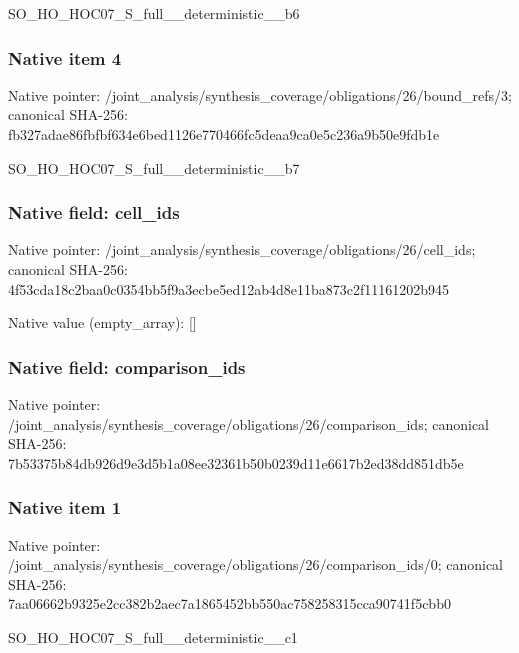 \documentclass[10pt,a4paper]{article}
\begin{document}
\begingroup\raggedright\sloppy SO\_\allowbreak{}HO\_\allowbreak{}HOC07\_\allowbreak{}S\_\allowbreak{}full\_\allowbreak{}\_\allowbreak{}deterministic\_\allowbreak{}\_\allowbreak{}b6\par\endgroup

\subsubsection{Native item 4}
Native pointer: /joint\_\allowbreak{}analysis/synthesis\_\allowbreak{}coverage/obligations/26/bound\_\allowbreak{}refs/3; canonical SHA-256: fb327adae86fbfbf634e6bed1126e770466fc5deaa9ca0e5c236a9b50e9fdb1e

\begingroup\raggedright\sloppy SO\_\allowbreak{}HO\_\allowbreak{}HOC07\_\allowbreak{}S\_\allowbreak{}full\_\allowbreak{}\_\allowbreak{}deterministic\_\allowbreak{}\_\allowbreak{}b7\par\endgroup

\subsubsection{Native field: cell\_\allowbreak{}ids}
Native pointer: /joint\_\allowbreak{}analysis/synthesis\_\allowbreak{}coverage/obligations/26/cell\_\allowbreak{}ids; canonical SHA-256: 4f53cda18c2baa0c0354bb5f9a3ecbe5ed12ab4d8e11ba873c2f11161202b945

Native value (empty\_\allowbreak{}array): []

\subsubsection{Native field: comparison\_\allowbreak{}ids}
Native pointer: /joint\_\allowbreak{}analysis/synthesis\_\allowbreak{}coverage/obligations/26/comparison\_\allowbreak{}ids; canonical SHA-256: 7b53375b84db926d9e3d5b1a08ee32361b50b0239d11e6617b2ed38dd851db5e

\subsubsection{Native item 1}
Native pointer: /joint\_\allowbreak{}analysis/synthesis\_\allowbreak{}coverage/obligations/26/comparison\_\allowbreak{}ids/0; canonical SHA-256: 7aa06662b9325e2cc382b2aec7a1865452bb550ac758258315cca90741f5cbb0

\begingroup\raggedright\sloppy SO\_\allowbreak{}HO\_\allowbreak{}HOC07\_\allowbreak{}S\_\allowbreak{}full\_\allowbreak{}\_\allowbreak{}deterministic\_\allowbreak{}\_\allowbreak{}c1\par\endgroup
\end{document}
